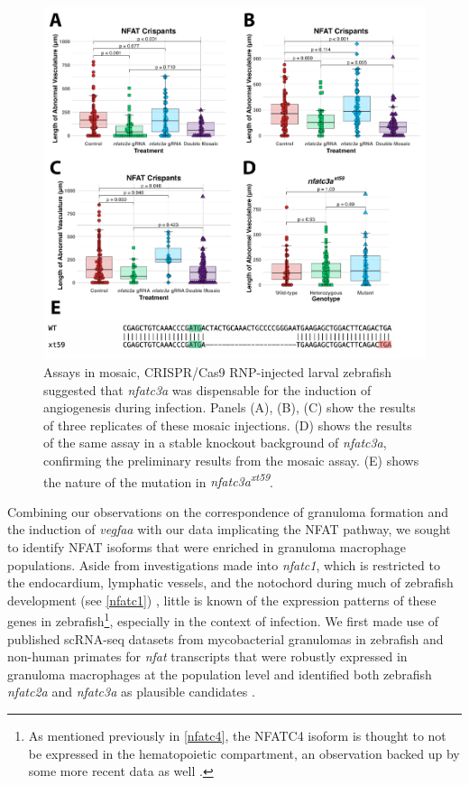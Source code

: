 \begin{figure}
\centering
\includegraphics[width=\textwidth]{images/mosaicnfatc3a.pdf}
\caption{Assays in mosaic, CRISPR/Cas9 RNP\hyp{}injected larval zebrafish suggested that \textit{nfatc3a} was dispensable for the induction of angiogenesis during infection. Panels (A), (B), (C) show the results of three replicates of these mosaic injections. (D) shows the results of the same assay in a stable knockout background of \textit{nfatc3a}, confirming the preliminary results from the mosaic assay. (E) shows the nature of the mutation in \textit{nfatc3a\textsuperscript{xt59}}.}
\label{figure:mosaic}
\end{figure}

Combining our observations on the correspondence of granuloma formation and the induction of \textit{vegfaa} with our data implicating the NFAT pathway, we sought to identify NFAT isoforms that were enriched in granuloma macrophage populations. Aside from investigations made into \textit{nfatc1}, which is restricted to the endocardium, lymphatic vessels, and the notochord during much of zebrafish development (see \autoref{nfatc1}) \citep{Pestel2016, Shin2019, Bagwell2020}, little is known of the expression patterns of these genes in zebrafish\footnote{As mentioned previously in \autoref{nfatc4}, the NFATC4 isoform is thought to not be expressed in the hematopoietic compartment, an observation backed up by some more recent data as well \citep{Peuker2022}.}, especially in the context of infection. We first made use of published scRNA\hyp{}seq datasets from mycobacterial granulomas in zebrafish and non\hyp{}human primates for \textit{nfat} transcripts that were robustly expressed in granuloma macrophages at the population level and identified both zebrafish \textit{nfatc2a} and \textit{nfatc3a} as plausible candidates \citep{Cronan2021, Gideon2022}.

